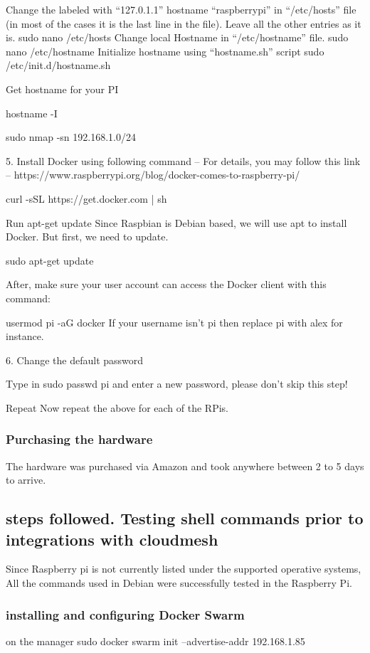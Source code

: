 \documentclass[sigconf]{acmart}
\begin{document}
	Change the labeled with “127.0.1.1” hostname “raspberrypi” in “/etc/hosts” file (in most of the cases it is the last line in the file).
	Leave all the other entries as it is.
	sudo nano /etc/hosts
	Change local Hostname in “/etc/hostname” file.
	sudo nano /etc/hostname
	Initialize hostname using “hostname.sh” script
	sudo /etc/init.d/hostname.sh
	
	Get hostname for your PI
	
	hostname -I
	
	sudo nmap -sn 192.168.1.0/24
	
	5. Install Docker using following command –
	For details, you may follow this link – https://www.raspberrypi.org/blog/docker-comes-to-raspberry-pi/
	
	curl -sSL https://get.docker.com | sh
	
	Run apt-get update
	Since Raspbian is Debian based, we will use apt to install Docker. But first, we need to update.
	
	sudo apt-get update
	
	After, make sure your user account can access the Docker client with this command:
	
	usermod pi -aG docker
	If your username isn't pi then replace pi with alex for instance.
	
	6. Change the default password
	
	Type in sudo passwd pi and enter a new password, please don't skip this step!
	
	Repeat
	Now repeat the above for each of the RPis.
	
	\subsubsection{Purchasing the hardware}
	The hardware was purchased via Amazon and took anywhere between 2 to 5 days to arrive.
	
	\subsection{steps followed. Testing shell commands prior to integrations with cloudmesh}
	Since Raspberry pi is not currently listed under the supported operative systems, All the commands used in Debian were successfully tested in the Raspberry Pi.
	
	\subsubsection{installing and configuring Docker Swarm}
	on the manager
	sudo docker swarm init --advertise-addr 192.168.1.85
	
\end{document}
